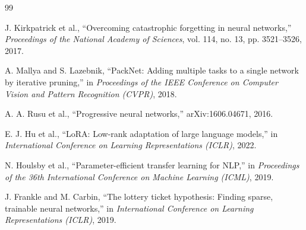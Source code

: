 \documentclass[12pt,a4paper]{report}
\begin{document}
\begin{thebibliography}{99}

J. Kirkpatrick et al., ``Overcoming catastrophic forgetting in neural
networks,'' \emph{Proceedings of the National Academy of Sciences},
vol. 114, no. 13, pp. 3521--3526, 2017.

A. Mallya and S. Lazebnik, ``PackNet: Adding multiple tasks to a
single network by iterative pruning,'' in \emph{Proceedings of the
IEEE Conference on Computer Vision and Pattern Recognition (CVPR)},
2018.

A. A. Rusu et al., ``Progressive neural networks,'' arXiv:1606.04671,
2016.

E. J. Hu et al., ``LoRA: Low-rank adaptation of large language models,''
in \emph{International Conference on Learning Representations (ICLR)},
2022.

N. Houlsby et al., ``Parameter-efficient transfer learning for NLP,''
in \emph{Proceedings of the 36th International Conference on Machine
Learning (ICML)}, 2019.

J. Frankle and M. Carbin, ``The lottery ticket hypothesis: Finding
sparse, trainable neural networks,'' in \emph{International Conference
on Learning Representations (ICLR)}, 2019.

\end{thebibliography}
\end{document}
